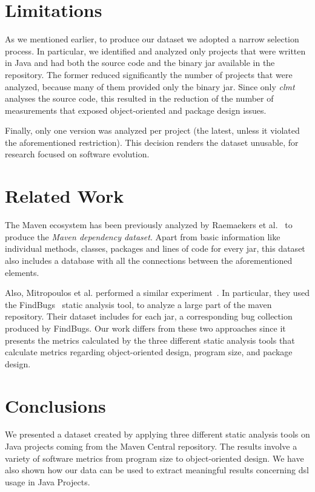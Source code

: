 \documentclass[conference]{IEEEtran}
\begin{document}
\section{Limitations}
\label{sec:limit}

As we mentioned earlier, to produce our dataset we adopted a narrow selection process. In particular, we identified and analyzed only projects that were written in Java and had both the source code and the binary {\sc jar} available in the repository. The former reduced significantly the number of projects that were analyzed, because many of them provided only the binary {\sc jar}. Since only \textit{clmt} analyses the source code, this resulted in the reduction of the number of measurements that exposed object-oriented and package design issues.

Finally, only one version was analyzed per project (the latest, unless it violated the aforementioned restriction).
This decision renders the dataset unusable, for research focused on software evolution.

\section{Related Work}
\label{sec:rel}

The Maven ecosystem has been previously analyzed by Raemaekers et al.~\cite{RDV13} to produce the {\it Maven dependency dataset}. Apart from basic information like individual methods, classes, packages and lines of code for every {\sc jar}, this dataset also includes a database with all the connections between the aforementioned elements.

Also, Mitropoulos et al. performed a similar experiment~\cite{MKLGS14}. In particular, they used the FindBugs~\cite{HP04} static analysis tool, to analyze a large part of the maven repository. Their dataset includes for each {\sc jar}, a corresponding bug collection produced by FindBugs. Our work differs from these two approaches since it presents the metrics calculated by the three different static analysis tools that calculate metrics regarding object-oriented design, program size, and package design.

\section{Conclusions}
\label{sec:conc}

We presented a dataset created by applying three different static analysis tools on Java projects coming from the Maven Central repository. The results involve a variety of software metrics from program size to object-oriented design. We have also shown how our data can be used to extract meaningful results concerning {\sc dsl} usage in Java Projects.
\end{document}
